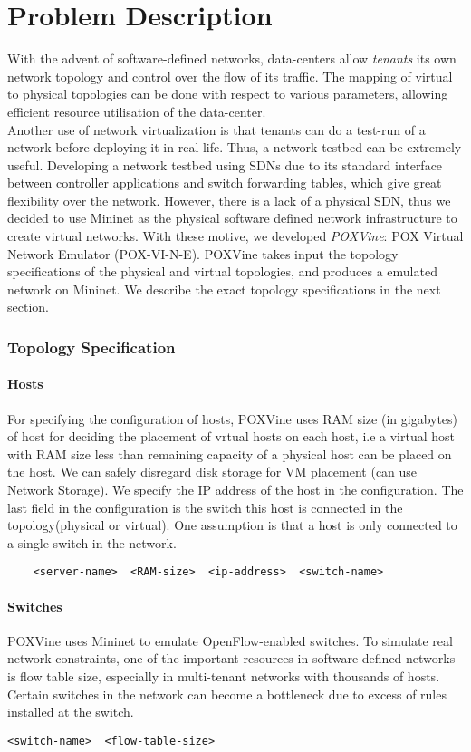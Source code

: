 \chapter{Problem Description}
With the advent of software-defined networks, data-centers allow \emph{tenants} its own network topology and control over the flow of its traffic. The mapping of virtual to physical topologies can be done with respect to various parameters, allowing efficient resource utilisation of the data-center. \\
Another use of network virtualization is that tenants can do a test-run of a network before deploying it in real life. Thus, a network testbed can be extremely useful. Developing a network testbed using SDNs due to its standard interface between controller applications and switch forwarding tables, which give great flexibility over the network. However, there is a lack of a physical SDN, thus we decided to use Mininet as the physical software defined network infrastructure to create virtual networks. With these motive, we developed \emph{POXVine}: POX Virtual Network Emulator (POX-VI-N-E).
POXVine takes input the topology specifications of the physical and virtual topologies, and produces a emulated network on Mininet. We describe the exact topology specifications in the next section.

\subsection{Topology Specification}
\subsubsection{Hosts}
For specifying the configuration of hosts, POXVine uses RAM size (in gigabytes) of host for deciding the placement of vrtual hosts on each host, i.e a virtual host with RAM size less than remaining capacity of a physical host can be placed on the host. We can safely disregard disk storage for VM placement (can use Network Storage).  We specify the IP address of the host in the configuration. The last field in the configuration is the switch this host is connected in the topology(physical or virtual). One assumption is that a host is only connected to a single switch in the network. 
\begin{verbatim}
	<server-name>  <RAM-size>  <ip-address>  <switch-name>
\end{verbatim}

\subsubsection{Switches}
POXVine uses Mininet to emulate OpenFlow-enabled switches. To simulate real network constraints, one of the important resources in software-defined networks is flow table size, especially in multi-tenant networks with thousands of hosts. Certain switches in the network can become a bottleneck due to excess of rules installed at the switch. 
\begin{verbatim}
<switch-name>  <flow-table-size>  
\end{verbatim}

